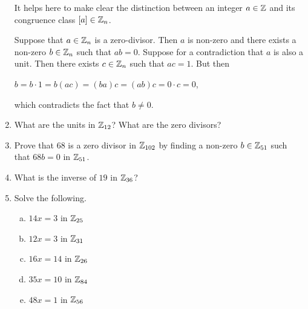 \documentclass[11pt,fleqn,dvipsnames,usenames]{article}
\begin{document}
\begin{enumerate}
\solution It helps here to make clear the distinction between an integer $a\in\mathbb{Z}$ and its congruence class $[a]\in\mathbb{Z}_{n}$.
\vsmsp

Suppose that $a\in\mathbb{Z}_{n}$ is a zero-divisor.  Then $a$ is non-zero and there exists a non-zero $b\in\mathbb{Z}_{n}$ such that $ab = 0$.  Suppose for a contradiction that $a$ is also a unit.  Then there exists $c\in\mathbb{Z}_{n}$ such that $ac = 1$.  But then
\begin{center}
$b = b\cdot 1 = b(ac) = (ba)c = (ab)c = 0\cdot c = 0$,
\end{center}
which contradicts the fact that $b\neq 0$.

\item What are the units in $\mathbb{Z}_{12}$?  What are the zero divisors?
\item Prove that $68$ is a zero divisor in $\mathbb{Z}_{102}$ by finding a non-zero $b\in\mathbb{Z}_{51}$ such that $68b = 0$ in $\mathbb{Z}_{51}$.
\item What is the inverse of $19$ in $\mathbb{Z}_{36}$?
\item Solve the following.
\begin{enumerate}[(a)]
\item $14x = 3$ in $\mathbb{Z}_{25}$
\item $12x = 3$ in $\mathbb{Z}_{31}$
\item $16x = 14$ in $\mathbb{Z}_{26}$
\item $35x = 10$ in $\mathbb{Z}_{84}$
\item $48x = 1$ in $\mathbb{Z}_{56}$
\end{enumerate}

\end{enumerate}
\end{document}
